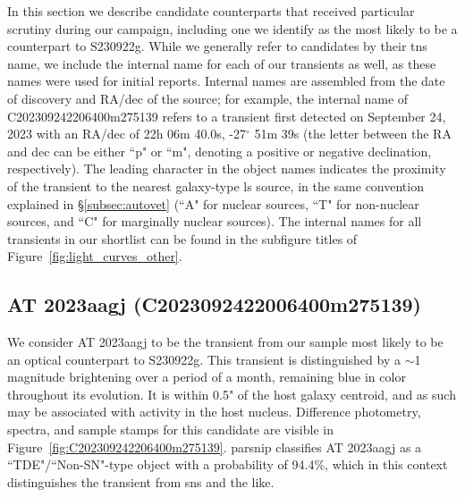 \documentclass[twocolumn]{aastex631}
\newcommand{\gweventid}{S230922g\xspace}
\begin{document}
In this section we describe candidate counterparts that received particular scrutiny during our campaign, including one we identify as the most likely to be a counterpart to \gweventid.
While we generally refer to candidates by their \gls{tns} name, we include the internal name for each of our transients as well, as these names were used for initial reports.
Internal names are assembled from the date of discovery and RA/dec of the source; for example, the internal name of C202309242206400m275139 refers to a transient first detected on September 24, 2023 with an RA/dec of 22h 06m 40.0s, -27$^\circ$ 51m 39s (the letter between the RA and dec can be either ``p" or ``m", denoting a positive or negative declination, respectively).
The leading character in the object names indicates the proximity of the transient to the nearest galaxy-type \gls{ls} source, in the same convention explained in \S\ref{subsec:autovet} (``A" for nuclear sources, ``T" for non-nuclear sources, and ``C" for marginally nuclear sources).
The internal names for all transients in our shortlist can be found in the subfigure titles of Figure~\ref{fig:light_curves_other}.

\subsection{AT 2023aagj (C2023092422006400m275139)}
\label{subsec:AT2023aagj}

We consider AT 2023aagj to be the transient from our sample most likely to be an optical counterpart to \gweventid.
This transient is distinguished by a $\sim$1 magnitude brightening over a period of a month, remaining blue in color throughout its evolution.
It is within 0.5" of the host galaxy centroid, and as such may be associated with activity in the host nucleus.
Difference photometry, spectra, and sample stamps for this candidate are visible in Figure~\ref{fig:C202309242206400m275139}.
\gls{parsnip} classifies AT 2023aagj as a ``TDE"/``Non-SN"-type object with a probability of 94.4\%, which in this context distinguishes the transient from \glspl{sn} and the like.
\end{document}
